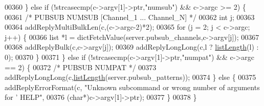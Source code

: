 \begin{DoxyCode}
00360     \} \textcolor{keywordflow}{else} \textcolor{keywordflow}{if} (!strcasecmp(c->argv[1]->ptr,\textcolor{stringliteral}{"numsub"}) && c->argc >= 2) \{
00361         \textcolor{comment}{/* PUBSUB NUMSUB [Channel\_1 ... Channel\_N] */}
00362         \textcolor{keywordtype}{int} j;
00363 
00364         addReplyMultiBulkLen(c,(c->argc-2)*2);
00365         \textcolor{keywordflow}{for} (j = 2; j < c->argc; j++) \{
00366             list *l = dictFetchValue(server.pubsub\_channels,c->argv[j]);
00367 
00368             addReplyBulk(c,c->argv[j]);
00369             addReplyLongLong(c,l ? \hyperlink{adlist_8h_afde0ab079f934670e82119b43120e94b}{listLength}(l) : 0);
00370         \}
00371     \} \textcolor{keywordflow}{else} \textcolor{keywordflow}{if} (!strcasecmp(c->argv[1]->ptr,\textcolor{stringliteral}{"numpat"}) && c->argc == 2) \{
00372         \textcolor{comment}{/* PUBSUB NUMPAT */}
00373         addReplyLongLong(c,\hyperlink{adlist_8h_afde0ab079f934670e82119b43120e94b}{listLength}(server.pubsub\_patterns));
00374     \} \textcolor{keywordflow}{else} \{
00375         addReplyErrorFormat(c, \textcolor{stringliteral}{"Unknown subcommand or wrong number of arguments for '%
       HELP"},
00376             (\textcolor{keywordtype}{char}*)c->argv[1]->ptr);
00377     \}
00378 \}
\end{DoxyCode}

